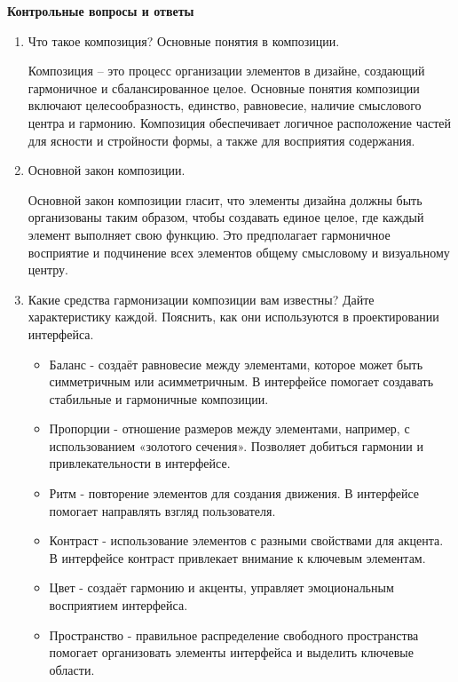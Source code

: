 \textbf{Контрольные вопросы и ответы}

\begin{enumerate}
    \item Что такое композиция? Основные понятия в композиции.

    Композиция – это процесс организации элементов в дизайне, создающий гармоничное и сбалансированное целое. Основные понятия композиции включают целесообразность, единство, равновесие, наличие смыслового центра и гармонию. Композиция обеспечивает логичное расположение частей для ясности и стройности формы, а также для восприятия содержания.

\item Основной закон композиции.

    Основной закон композиции гласит, что элементы дизайна должны быть организованы таким образом, чтобы создавать единое целое, где каждый элемент выполняет свою функцию. Это предполагает гармоничное восприятие и подчинение всех элементов общему смысловому и визуальному центру.

\item Какие средства гармонизации композиции вам известны? Дайте характеристику каждой. Пояснить, как они используются в проектировании интерфейса.

    \begin{itemize}
        \item Баланс - создаёт равновесие между элементами, которое может быть симметричным или асимметричным. В интерфейсе помогает создавать стабильные и гармоничные композиции.
        \item Пропорции - отношение размеров между элементами, например, с использованием «золотого сечения». Позволяет добиться гармонии и привлекательности в интерфейсе.
        \item Ритм - повторение элементов для создания движения. В интерфейсе помогает направлять взгляд пользователя.
        \item Контраст - использование элементов с разными свойствами для акцента. В интерфейсе контраст привлекает внимание к ключевым элементам.
        \item Цвет - создаёт гармонию и акценты, управляет эмоциональным восприятием интерфейса.
        \item Пространство - правильное распределение свободного пространства помогает организовать элементы интерфейса и выделить ключевые области.
    \end{itemize}


\end{enumerate}
